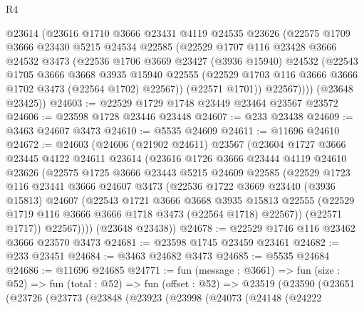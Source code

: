 \begin{lexlean}{R4}
\begin{coremodule}
        @23614
        (@23616
          @1710
          @3666
          @23431
          @4119
          @24535
          @23626
          (@22575
            @1709
            @3666
            @23430
            @5215
            @24534
            @22585
            (@22529
              @1707
              @116
              @23428
              @3666
              @24532
              @3473
              (@22536
                @1706
                @3669
                @23427
                (@3936 @15940)
                @24532
                (@22543
                  @1705
                  @3666
                  @3668
                  @3935
                  @15940
                  @22555
                  (@22529 @1703 @116 @3666 @3666 @1702 @3473 (@22564 @1702) @22567))
                (@22571 @1701))
              @22567))))
      (@23648 @23425))
@24603 := @22529 @1729 @1748 @23449 @23464 @23567 @23572
@24606 := @23598 @1728 @23446 @23448
@24607 := @233 @23438
@24609 := @3463 @24607 @3473
@24610 := @5535 @24609
@24611 := @11696 @24610
@24672 := @24603
    (@24606
      (@21902 @24611)
      @23567
      (@23604
        @1727
        @3666
        @23445
        @4122
        @24611
        @23614
        (@23616
          @1726
          @3666
          @23444
          @4119
          @24610
          @23626
          (@22575
            @1725
            @3666
            @23443
            @5215
            @24609
            @22585
            (@22529
              @1723
              @116
              @23441
              @3666
              @24607
              @3473
              (@22536
                @1722
                @3669
                @23440
                (@3936 @15813)
                @24607
                (@22543
                  @1721
                  @3666
                  @3668
                  @3935
                  @15813
                  @22555
                  (@22529 @1719 @116 @3666 @3666 @1718 @3473 (@22564 @1718) @22567))
                (@22571 @1717))
              @22567))))
      (@23648 @23438))
@24678 := @22529 @1746 @116 @23462 @3666 @23570 @3473
@24681 := @23598 @1745 @23459 @23461
@24682 := @233 @23451
@24684 := @3463 @24682 @3473
@24685 := @5535 @24684
@24686 := @11696 @24685
@24771 := fun (message : @3661) =>
  fun (size : @52) =>
  fun (total : @52) =>
  fun (offset : @52) =>
  @23519
    (@23590
      (@23651
        (@23726
          (@23773
            (@23848
              (@23923
                (@23998
                  (@24073
                    (@24148
                      (@24222

\end{coremodule}
\end{lexlean}
